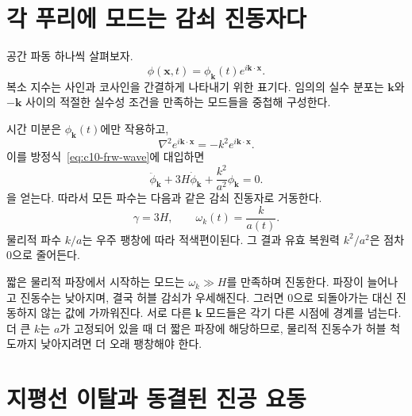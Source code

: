 \begin{classroomqa}
\end{classroomqa}

\section{각 푸리에 모드는 감쇠 진동자다}

공간 파동 하나씩 살펴보자.
\begin{equation}
\phi(\mathbf x,t)
=\phi_{\mathbf k}(t)e^{i\mathbf k\cdot\mathbf x}.
\label{eq:c10-mode-ansatz}
\end{equation}
복소 지수는 사인과 코사인을 간결하게 나타내기 위한 표기다. 임의의 실수 분포는 \(\mathbf k\)와 \(-\mathbf k\) 사이의 적절한 실수성 조건을 만족하는 모드들을 중첩해 구성한다.

시간 미분은 \(\phi_{\mathbf k}(t)\)에만 작용하고,
\[
\nabla^2e^{i\mathbf k\cdot\mathbf x}
=-k^2e^{i\mathbf k\cdot\mathbf x}.
\]
이를 방정식~\eqref{eq:c10-frw-wave}에 대입하면
\begin{equation}
\ddot\phi_{\mathbf k}
+3H\dot\phi_{\mathbf k}
+\frac{k^2}{a^2}\phi_{\mathbf k}=0.
\label{eq:c10-mode-equation}
\end{equation}
을 얻는다. 따라서 모든 파수는 다음과 같은 감쇠 진동자로 거동한다.
\begin{equation}
\gamma=3H,
\qquad
\omega_k(t)=\frac{k}{a(t)}.
\label{eq:c10-mode-identification}
\end{equation}
물리적 파수 \(k/a\)는 우주 팽창에 따라 적색편이된다. 그 결과 유효 복원력 \(k^2/a^2\)은 점차 0으로 줄어든다.

짧은 물리적 파장에서 시작하는 모드는 \(\omega_k\gg H\)를 만족하며 진동한다. 파장이 늘어나고 진동수는 낮아지며, 결국 허블 감쇠가 우세해진다. 그러면 0으로 되돌아가는 대신 진동하지 않는 값에 가까워진다. 서로 다른 \(\mathbf k\) 모드들은 각기 다른 시점에 경계를 넘는다. 더 큰 \(k\)는 \(a\)가 고정되어 있을 때 더 짧은 파장에 해당하므로, 물리적 진동수가 허블 척도까지 낮아지려면 더 오래 팽창해야 한다.

\section{지평선 이탈과 동결된 진공 요동}

